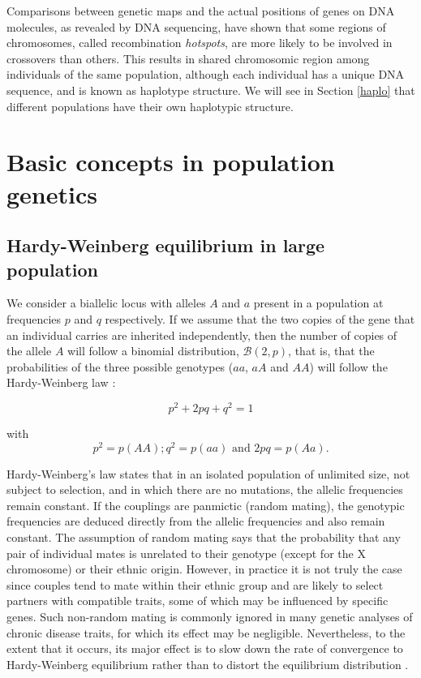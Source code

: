 \documentclass[]{book}
\begin{document}
Comparisons between genetic maps and the actual positions of genes on
DNA molecules, as revealed by DNA sequencing, have shown that some
regions of chromosomes, called recombination \emph{hotspots}, are more likely
to be involved in crossovers than others. This results in shared
chromosomic region among individuals of the same population, although
each individual has a unique DNA sequence, and is known as haplotype
structure. We will see in Section \ref{haplo} that different
populations have their own haplotypic structure.

\hypertarget{basic-concepts-in-population-genetics}{%
\section{Basic concepts in population genetics}\label{basic-concepts-in-population-genetics}}

\hypertarget{HWE}{%
\subsection{Hardy-Weinberg equilibrium in large population}\label{HWE}}

We consider a biallelic locus with alleles \(A\) and \(a\) present in a
population at frequencies \(p\) and \(q\) respectively. If we assume that
the two copies of the gene that an individual carries are inherited
independently, then the number of copies of the allele \(A\) will follow a
binomial distribution, \(\mathcal{B}(2,p)\), that is, that the
probabilities of the three possible genotypes (\(aa\), \(aA\) and \(AA\)) will
follow the Hardy-Weinberg law \citep{weinberg1908ber}:

\[p^2 + 2pq + q^2 = 1\]

with \[p^2 = p(AA); q^2 = p(aa) \mbox{ and } 2pq = p(Aa).\]

Hardy-Weinberg's law states that in an isolated population of unlimited
size, not subject to selection, and in which there are no mutations, the
allelic frequencies remain constant. If the couplings are panmictic
(random mating), the genotypic frequencies are deduced directly from the
allelic frequencies and also remain constant. The assumption of random
mating says that the probability that any pair of individual mates is
unrelated to their genotype (except for the X chromosome) or their
ethnic origin. However, in practice it is not truly the case since
couples tend to mate within their ethnic group and are likely to select
partners with compatible traits, some of which may be influenced by
specific genes. Such non-random mating is commonly ignored in many
genetic analyses of chronic disease traits, for which its effect may be
negligible. Nevertheless, to the extent that it occurs, its major effect
is to slow down the rate of convergence to Hardy-Weinberg equilibrium
rather than to distort the equilibrium distribution
\citep{thomas2004statistical}.
\end{document}
